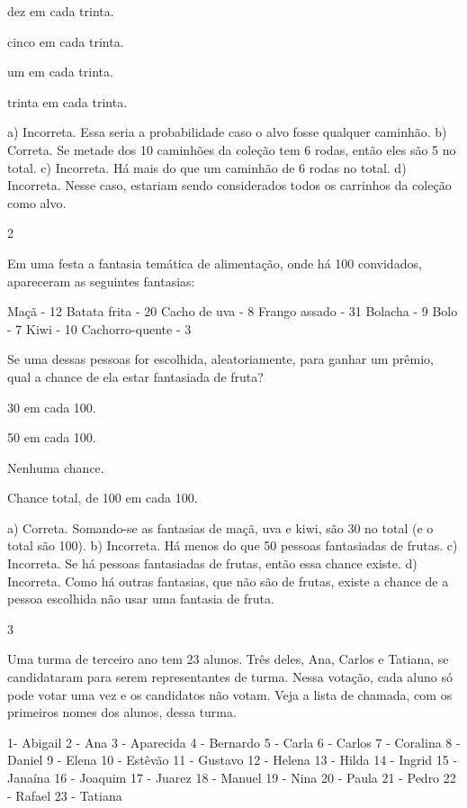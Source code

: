 \begin{escolha}
{\begin{escolha}
\begin{escolha}
\item
  dez em cada trinta.
\item
  cinco em cada trinta.
\item
  um em cada trinta.
\item
  trinta em cada trinta.
\end{escolha}

a) Incorreta. Essa seria a probabilidade caso o alvo fosse qualquer caminhão.
b) Correta. Se metade dos 10 caminhões da coleção tem 6 rodas, então eles são 5 no total.
c) Incorreta. Há mais do que um caminhão de 6 rodas no total.
d) Incorreta. Nesse caso, estariam sendo considerados todos os carrinhos da coleção como alvo.

\num{2}

Em uma festa a fantasia temática de alimentação, onde há 100 convidados, apareceram as seguintes fantasias:

Maçã - 12
Batata frita - 20
Cacho de uva - 8
Frango assado - 31
Bolacha - 9
Bolo - 7
Kiwi - 10
Cachorro-quente - 3

  Se uma dessas pessoas for escolhida, aleatoriamente, para ganhar um prêmio, qual a chance de ela estar fantasiada de fruta?


\begin{escolha}
\item
30 em cada 100.
\item
50 em cada 100.
\item
Nenhuma chance.
\item
Chance total, de 100 em cada 100.
\end{escolha}

a) Correta. Somando-se as fantasias de maçã, uva e kiwi, são 30 no total (e o total são 100).
b) Incorreta. Há menos do que 50 pessoas fantasiadas de frutas.
c) Incorreta. Se há pessoas fantasiadas de frutas, então essa chance existe.
d) Incorreta. Como há outras fantasias, que não são de frutas, existe a chance de a pessoa escolhida não usar uma fantasia de fruta.

\num{3}

Uma turma de terceiro ano tem 23 alunos. Três deles, Ana, Carlos e Tatiana, se candidataram para serem representantes de turma. Nessa votação, cada aluno só pode votar uma vez e os candidatos não votam. Veja a lista de chamada, com os primeiros nomes dos alunos, dessa turma.

1- Abigail
2 - Ana
3 - Aparecida
4 - Bernardo
5 - Carla
6 - Carlos
7 - Coralina
8 - Daniel 
9 - Elena
10 - Estêvão
11 - Gustavo
12 - Helena
13 - Hilda
14 - Ingrid
15 - Janaína
16 - Joaquim
17 - Juarez
18 - Manuel
19 - Nina
20 - Paula
21 - Pedro
22 - Rafael
23 - Tatiana


\end{escolha}}
\end{escolha}
